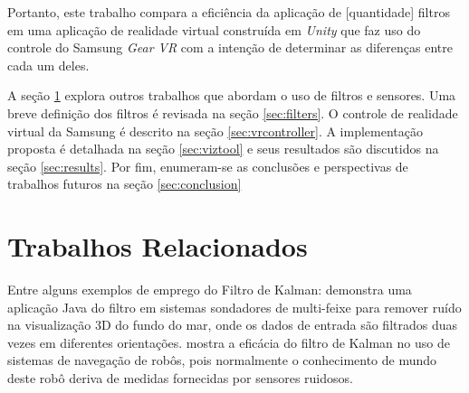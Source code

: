 \documentclass[conference]{IEEEtran}
\begin{document}

Portanto, este trabalho compara a eficiência da aplicação de [quantidade] filtros em uma aplicação de realidade virtual construída em \textit{Unity} que faz uso do controle do Samsung \textit{Gear VR} com a intenção de determinar as diferenças entre cada um deles.

A seção \ref{sec:relatedworks} explora outros trabalhos que abordam o uso de filtros e sensores. Uma breve definição dos filtros é revisada na seção \ref{sec:filters}. O controle de realidade virtual da Samsung é descrito na seção \ref{sec:vrcontroller}. A implementação proposta é detalhada na seção \ref{sec:viztool} e seus resultados são discutidos na seção \ref{sec:results}. Por fim, enumeram-se as conclusões e perspectivas de trabalhos futuros na seção \ref{sec:conclusion}

\section{Trabalhos Relacionados} \label{sec:relatedworks}

Entre alguns exemplos de emprego do Filtro de Kalman: \cite{demkowiczkalman} demonstra uma aplicação Java do filtro em sistemas sondadores de multi-feixe para remover ruído na visualização 3D do fundo do mar, onde os dados de entrada são filtrados duas vezes em diferentes orientações. \cite{choset2005principles} mostra a eficácia do filtro de Kalman no uso de sistemas de navegação de robôs, pois normalmente o conhecimento de mundo deste robô deriva de medidas fornecidas por sensores ruidosos.
\end{document}
